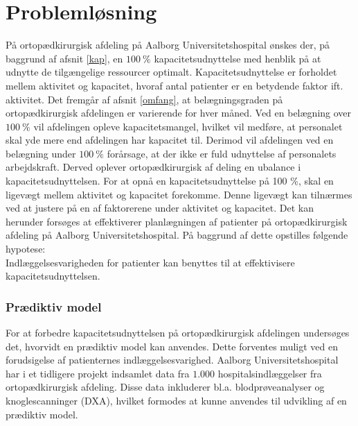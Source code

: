 \chapter{Problemløsning}
På ortopædkirurgisk afdeling på Aalborg Universitetshospital ønskes der, på baggrund af afsnit \ref{kap}, en $100~\%$ kapacitetsudnyttelse med henblik på at udnytte de tilgængelige ressourcer optimalt. Kapacitetsudnyttelse er forholdet mellem aktivitet og kapacitet, hvoraf antal patienter er en betydende faktor ift. aktivitet. 
Det fremgår af afsnit \ref{omfang}, at belægningsgraden på ortopædkirurgisk afdelingen er varierende for hver måned. Ved en belægning over $100~\%$ vil afdelingen opleve kapacitetsmangel, hvilket vil medføre, at personalet skal yde mere end afdelingen har kapacitet til. Derimod vil afdelingen ved en belægning under $100~\%$ forårsage, at der ikke er fuld udnyttelse af personalets arbejdskraft. Derved oplever ortopædkirurgisk af deling en ubalance i kapacitetsudnyttelsen. 
For at opnå en kapacitetsudnyttelse på 100 \%, skal en ligevægt mellem aktivitet og kapacitet forekomme. Denne ligevægt kan tilnærmes ved at justere på en af faktorerene under aktivitet og kapacitet\cite{Bames2015}. Det kan herunder forsøges at effektiverer planlægningen af patienter på ortopædkirurgisk afdeling på Aalborg Universitetshospital.
På baggrund af dette opstilles følgende hypotese:\\

\noindent
Indlæggelsesvarigheden for patienter kan benyttes til at effektivisere kapacitetsudnyttelsen. 

\subsection{Prædiktiv model}
For at forbedre kapacitetsudnyttelsen på ortopædkirurgisk afdelingen undersøges det, hvorvidt en prædiktiv model kan anvendes.
Dette forventes muligt ved en forudsigelse af patienternes indlæggelsesvarighed. Aalborg Universitetshospital har i et tidligere projekt indsamlet data fra $1.000$ hospitalsindlæggelser fra ortopædkirurgisk afdeling. Disse data inkluderer bl.a. blodprøveanalyser og knoglescanninger (DXA), hvilket formodes at kunne anvendes til udvikling af en prædiktiv model. 

